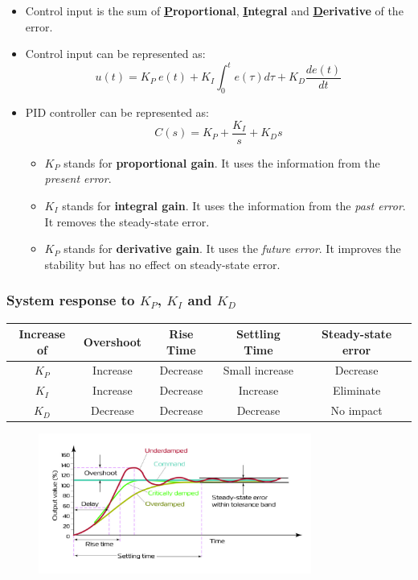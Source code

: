 \begin{itemize}
    \item Control input is the sum of \textbf{\underline{P}roportional}, \textbf{\underline{I}ntegral} and \textbf{\underline{D}erivative} of the error.
    
    \item Control input can be represented as:
    \[
    u(t) = K_{P}\  e(t)+K_{I}\int_{0}^{t}e(\tau)d\tau + K_{D}\frac{de(t)}{dt}
    \]
    
    \item PID controller can be represented as:
    \[C(s) =K_{P}+\frac{K_{I}}{s}+K_{D}s \]
    
        \begin{itemize}
             \item $K_{P}$ stands for \textbf{proportional gain}. It uses the information from the \textit{present error}.
             \item $K_{I}$ stands for \textbf{integral gain}. It uses the information from the \textit{past error}.
             It removes the steady-state error.
             \item $K_{P}$ stands for \textbf{derivative gain}. It uses the \textit{future error}. It improves the stability but has no effect on steady-state error.
        \end{itemize}
\end{itemize}

\subsubsection{System response to $K_{P}$, $K_{I}$ and $K_{D}$}
\begin{table}[H] \centering
    \begin{tabular}{|c|c|c|c|c|} \hline
        \textbf{Increase of} &\textbf{Overshoot}& \textbf{Rise Time} &\textbf{Settling Time}& \textbf{Steady-state error}\\ \hline
        $K_{P}$&Increase&  Decrease& Small increase& Decrease\\ \hline
        $K_{I}$&Increase &Decrease& Increase& Eliminate\\ \hline
        $K_{D}$&Decrease& Decrease& Decrease& No impact\\ \hline
    \end{tabular}
\end{table}

\begin{figure}[H] 
    \centering
    \includegraphics[width=0.8\textwidth]{images/PID_response.jpg}
\end{figure}